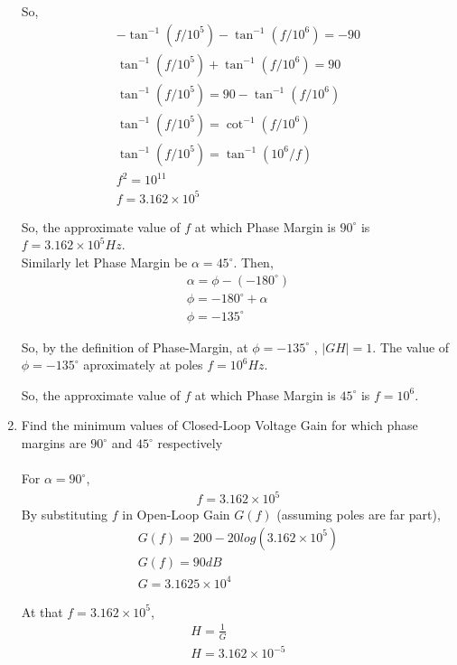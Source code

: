 \begin{enumerate}[label=\thesubsection.\arabic*.,ref=\thesubsection.\theenumi]
So,
\begin{align}
-\tan^{-1}\left(f/10^{5}\right)-\tan^{-1}\left(f/10^{6}\right) = -90\\
\tan^{-1}\left(f/10^{5}\right)+\tan^{-1}\left(f/10^{6}\right) = 90\\
\tan^{-1}\left(f/10^{5}\right) = 90-\tan^{-1}\left(f/10^{6}\right)\\
\tan^{-1}\left(f/10^{5}\right) = \cot^{-1}\left(f/10^{6}\right)\\
\tan^{-1}\left(f/10^{5}\right) = \tan^{-1}\left(10^{6}/f\right)\\
f^{2} = 10^{11}\\
f = 3.162 \times 10^{5}
\end{align}

So, the approximate value of $f$ at which Phase Margin is $90^{\circ}$ is $f=3.162 \times 10^{5} Hz$.\\

Similarly let Phase Margin be $\alpha = 45^{\circ}$. Then,
\begin{align}
\alpha = \phi - (-180^{\circ})\\
\phi = -180^{\circ} + \alpha\\
\phi = -135^{\circ}
\end{align}

So, by the definition of Phase-Margin, at $\phi = -135^{\circ}$ , $|GH| = 1 $.  The value of $\phi = -135^{\circ}$ aproximately at poles $f=10^{6} Hz$. 

So, the approximate value of $f$ at which Phase Margin is $45^{\circ}$ is $f=10^{6}$.\\

\item Find the minimum values of Closed-Loop Voltage Gain for which phase margins are $90^{\circ}$ and  $45^{\circ}$ respectively\\
\solution\\
For $\alpha=90^{\circ}$,
\begin{align}
f=3.162 \times 10^{5}
\end{align}
By substituting $f$ in Open-Loop Gain $G(f)$ (assuming poles are far part), 
\begin{align}
G(f) = 200 - 20log(3.162 \times 10^{5})\\
G(f) = 90 dB \\
G = 3.1625 \times 10^{4}
\end{align}

At that $f=3.162 \times 10^{5}$, 
\begin{align}
H = \frac{1}{G}\\
H = 3.162 \times 10^{-5}
\end{align}


\end{enumerate}
